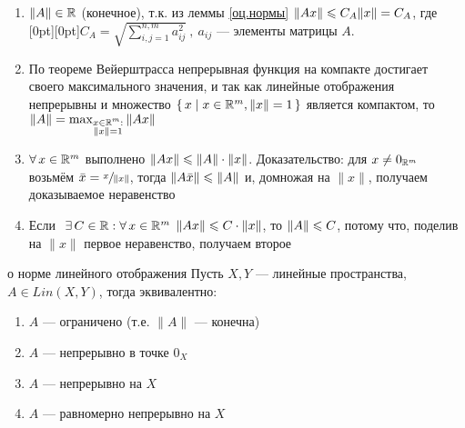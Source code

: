 \begin{zam}[https://youtu.be/OazzLm0DJN4?si=PGiZPb67g0zgXEMt&t=547]\label{зам к опр. норм.} %
	\begin{enumerate} 
		\item $\|A\| \in \mathbb R$ (конечное), т.к. из леммы \ref{оц.нормы} $\|Ax\| \leqslant C_A\|x\| = C_A$, где \raisebox{0pt}[0pt][0pt]{$C_A = \sqrt{\sum\limits_{i, j = 1}^{n, m}a_{ij}^2}\ ,\ a_{ij}$} --- элементы матрицы $A$.\medskip
		
		\item По теореме Вейерштрасса непрерывная функция на компакте достигает своего максимального значения, и так как линейные отображения непрерывны и множество $\{\, x \mid x \in \mathbb R^m, \|x\| = 1 \,\}$ является компактом, то $\|A\| = \max_{\substack{x \in \mathbb R^m: \\ \|x\| = 1}} \|Ax\|$  
		
		\item $\forall \, x \in \mathbb R^m$ выполнено $\|Ax\| \leqslant \|A\| \cdot \|x\|$. Доказательство: для $x \ne 0_{\mathbb R^m}$ возьмём $\bar x = \sfrac{x}{\|x\|}$, тогда $\|A\bar x\| \leqslant \|A\|$  и, домножая на $\|x\|$, получаем доказываемое неравенство \vspace{-8pt}
		
		\item Если$\E C \in \rr : \A x \in \rmm$ $\|Ax\| \leqslant C \cdot \|x\|$, то $\|A\| \leqslant C$, потому что, поделив на $\|x\|$ первое неравенство, получаем второе 
		\end{enumerate}
\end{zam} %
\vspace{-1.5ex}
\begin{lem}[https://youtu.be/OazzLm0DJN4?si=Qwpn9tVeLwf_T6DS&t=1617]{о норме линейного отображения}
	Пусть $X, Y$ --- линейные пространства, $A \in Lin(X, Y)$, тогда эквивалентно:
	\begin{multicols}{2}\begin{enumerate}[itemindent=20pt]
		\item $A$ --- ограничено (т.е. $\|A\|$ --- конечна)
		
		\item $A$ --- непрерывно в точке $0_X$
		
		\item $A$ --- непрерывно на $X$
		
		\item $A$ --- равномерно непрерывно на $X$
	\end{enumerate}\end{multicols}
\end{lem}

